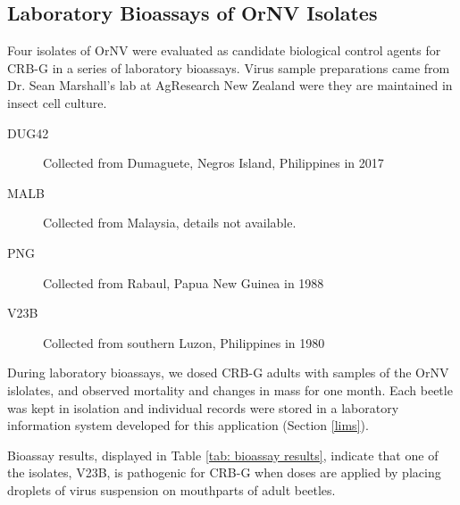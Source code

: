 \documentclass[12pt,letterpaper,english,bibliography=totocnumbered,abstract=on]{scrartcl}
\begin{document}
\subsection{Laboratory Bioassays of OrNV Isolates}

Four isolates of OrNV were evaluated as candidate biological control agents for CRB-G in a series of laboratory bioassays. Virus sample preparations came from Dr. Sean Marshall's lab at AgResearch New Zealand were they are maintained in insect cell culture.

\begin{description}
	\item[DUG42] Collected from Dumaguete, Negros Island, Philippines in 2017
	\item[MALB] Collected from Malaysia, details not available.
	\item[PNG] Collected from Rabaul, Papua New Guinea in 1988
	\item[V23B] Collected from southern Luzon, Philippines in 1980
\end{description}

During laboratory bioassays, we dosed CRB-G adults with samples of the OrNV islolates, and observed mortality and changes in mass for one month. Each beetle was kept in isolation and individual records were stored in a laboratory information system developed for this application (Section \ref{lims}).



Bioassay results, displayed in Table \ref{tab: bioassay results}, indicate that one of the isolates, V23B, is pathogenic for CRB-G when doses are applied by placing droplets of virus suspension on mouthparts of adult beetles.
\end{document}
